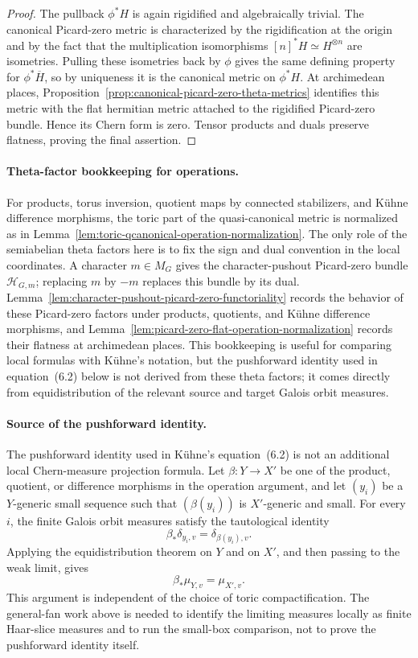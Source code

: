 \documentclass[10pt,a4paper]{amsart}
\theoremstyle{plain}
\theoremstyle{plain}
\numberwithin{equation}{section}
\begin{document}
\begin{proof}
	The pullback \(\phi^*H\) is again rigidified and algebraically trivial.  The
	canonical Picard-zero metric is characterized by the rigidification at the
	origin and by the fact that the multiplication isomorphisms
	\([n]^*H\simeq H^{\otimes n}\) are isometries.  Pulling these isometries back
	by \(\phi\) gives the same defining property for \(\phi^*\overline H\), so by
	uniqueness it is the canonical metric on \(\phi^*H\).  At archimedean places,
	Proposition~\ref{prop:canonical-picard-zero-theta-metrics} identifies this
	metric with the flat hermitian metric attached to the rigidified Picard-zero
	bundle.  Hence its Chern form is zero.  Tensor products and duals preserve
	flatness, proving the final assertion.
\end{proof}

\paragraph{Theta-factor bookkeeping for operations.}
For products, torus inversion, quotient maps by connected stabilizers, and
K\"uhne difference morphisms, the toric part of the quasi-canonical metric is
normalized as in Lemma~\ref{lem:toric-qcanonical-operation-normalization}.
The only role of the semiabelian theta factors here is to fix the sign and
dual convention in the local coordinates.  A character \(m\in M_G\) gives the
character-pushout Picard-zero bundle \(\mathcal H_{G,m}\); replacing \(m\) by
\(-m\) replaces this bundle by its dual.  Lemma~\ref{lem:character-pushout-picard-zero-functoriality}
records the behavior of these Picard-zero factors under products, quotients,
and K\"uhne difference morphisms, and
Lemma~\ref{lem:picard-zero-flat-operation-normalization} records their
flatness at archimedean places.  This bookkeeping is useful for comparing
local formulas with K\"uhne's notation, but the pushforward identity used in
equation~(6.2) below is not derived from these theta factors; it comes directly
from equidistribution of the relevant source and target Galois orbit measures.

\paragraph{Source of the pushforward identity.}
The pushforward identity used in K\"uhne's equation~(6.2) is not an additional
local Chern-measure projection formula.  Let
\(\beta:Y\to X'\) be one of the product, quotient, or difference morphisms in
the operation argument, and let \((y_i)\) be a \(Y\)-generic small sequence
such that \((\beta(y_i))\) is \(X'\)-generic and small.  For every \(i\), the
finite Galois orbit measures satisfy the tautological identity
\[
\beta_*\delta_{y_i,v}=\delta_{\beta(y_i),v}.
\]
Applying the equidistribution theorem on \(Y\) and on \(X'\), and then passing
to the weak limit, gives
\[
\beta_*\mu_{Y,v}=\mu_{X',v}.
\]
This argument is independent of the choice of toric compactification.  The
general-fan work above is needed to identify the limiting measures locally as
finite Haar-slice measures and to run the small-box comparison, not to prove
the pushforward identity itself.
\end{document}
